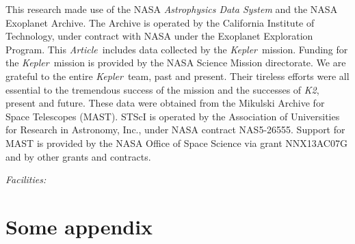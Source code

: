 \documentclass[12pt,preprint]{aastex}
\newcommand{\project}[1]{\textsl{#1}}
\newcommand{\kepler}{\project{Kepler}}
\newcommand{\KT}{\project{K2}}
\newcommand{\paper}{\textsl{Article}}
\newcommand{\figlabel}[1]{\label{fig:#1}}
\begin{document}
This research made use of the NASA \project{Astrophysics Data System} and the
NASA Exoplanet Archive.
The Archive is operated by the California Institute of Technology, under
contract with NASA under the Exoplanet Exploration Program.
This \paper\ includes data collected by the \kepler\ mission. Funding for the
\kepler\ mission is provided by the NASA Science Mission directorate.
We are grateful to the entire \kepler\ team, past and present.
Their tireless efforts were all essential to the tremendous success of the
mission and the successes of \KT, present and future.
These data were obtained from the Mikulski Archive for Space Telescopes
(MAST).
STScI is operated by the Association of Universities for Research in
Astronomy, Inc., under NASA contract NAS5-26555.
Support for MAST is provided by the NASA Office of Space Science via grant
NNX13AC07G and by other grants and contracts.

{\it Facilities:} 

\appendix

\section{Some appendix}

\clearpage

\clearpage


\end{document}
